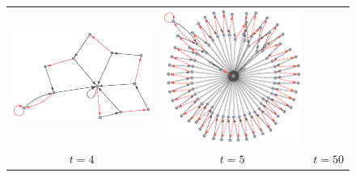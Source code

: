 \documentclass[12pt,a4paper]{article}
\begin{document}
\begin{figure}[htp]
\begin{tabular}{c c c}
\includegraphics[scale=0.5]{img/184/5.eps} &
\includegraphics[scale=0.5]{img/184/50.eps}  \\
$t = 4$ & $t = 5$ & $t = 50$ \\

\end{tabular}
\end{figure}
\end{document}
